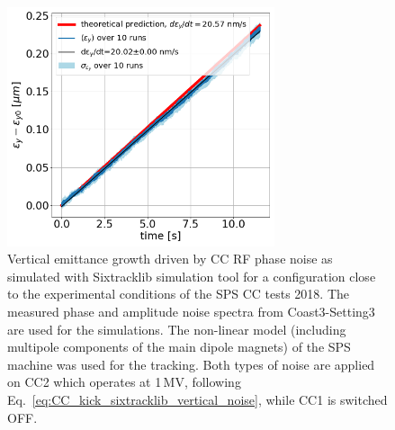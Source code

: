 \begin{figure}[!h]
    \centering         
    \includegraphics[width=0.7\textwidth]{images/Ch6/study_5_non_linear_sps_model_sixtracklib.png}
        \caption{Vertical emittance growth driven by CC RF phase noise as simulated with Sixtracklib simulation tool for a configuration close to the experimental conditions of the SPS CC tests 2018. The measured phase and amplitude noise spectra from Coast3-Setting3 are used for the simulations. The non-linear model (including multipole components of the main dipole magnets) of the SPS machine was used for the tracking. Both types of noise are applied on CC2 which operates at 1\,MV, following Eq.~\eqref{eq:CC_kick_sixtracklib_vertical_noise}, while CC1 is switched OFF.}
        \label{fig:study_5_sixtracklib_global_cc_scheme_measured_spectra_PN_b3b5b7}
\end{figure}





